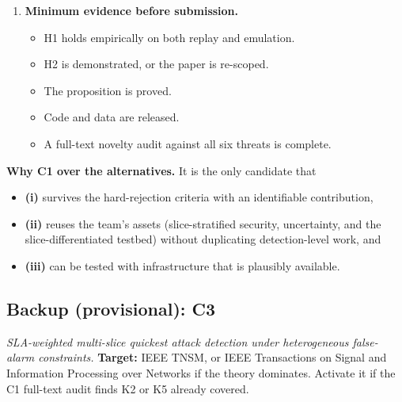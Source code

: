 \begin{enumerate}
  \begin{itemize}
  \tightlist
  \item
    The certified set may be empty at a realistic \(n\) $\rightarrow$ use
    fixed-sequence testing, coarser policy grids, or larger budgets for
    mMTC.
  \item
    Replay may be too slow $\rightarrow$ use a surrogate twin with an
    \(\varepsilon\) bound.
  \item
    A full read may show that a threat paper (CALIBURN, RBSID, CPC)
    already covers K2 $\rightarrow$ fall back to C3.
  \end{itemize}
\item
  \textbf{Minimum evidence before submission.}

  \begin{itemize}
  \tightlist
  \item
    H1 holds empirically on both replay and emulation.
  \item
    H2 is demonstrated, or the paper is re-scoped.
  \item
    The proposition is proved.
  \item
    Code and data are released.
  \item
    A full-text novelty audit against all six threats is complete.
  \end{itemize}
\end{enumerate}

\textbf{Why C1 over the alternatives.} It is the only candidate that

\begin{itemize}
\tightlist
\item
  \textbf{(i)} survives the hard-rejection criteria with an identifiable
  contribution,
\item
  \textbf{(ii)} reuses the team's assets (slice-stratified security,
  uncertainty, and the slice-differentiated testbed) without duplicating
  detection-level work, and
\item
  \textbf{(iii)} can be tested with infrastructure that is plausibly
  available.
\end{itemize}

\hypertarget{backup-provisional-c3}{%
\subsection{Backup (provisional): C3}\label{backup-provisional-c3}}

\emph{SLA-weighted multi-slice quickest attack detection under
heterogeneous false-alarm constraints.} \textbf{Target:} IEEE TNSM, or
IEEE Transactions on Signal and Information Processing over Networks if
the theory dominates. Activate it if the C1 full-text audit finds K2 or
K5 already covered.

